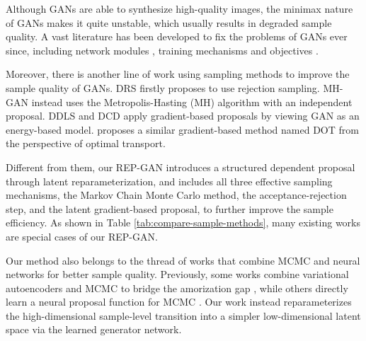 \documentclass[runningheads]{llncs}
\newcommand{\<}{\left\langle}
\renewcommand{\>}{\right\rangle}
\begin{document}
Although GANs are able to synthesize high-quality images, the minimax nature of GANs makes it quite unstable, which usually results in degraded sample quality. 
A vast literature has been developed to fix the problems of GANs ever since, including network modules \cite{miyato2018spectral}, training mechanisms \cite{metz2016unrolled} and  objectives \cite{arjovsky2017wasserstein}.


Moreover, there is another line of work using sampling methods to improve the sample quality of GANs. DRS \cite{azadi2019discriminator} firstly proposes to use rejection sampling. MH-GAN \cite{turner2019metropolis} instead uses the Metropolis-Hasting (MH) algorithm with an independent proposal. DDLS \cite{che2020your} and DCD \cite{song2020discriminator} apply  gradient-based proposals by viewing GAN as an energy-based model. \cite{tanaka2019discriminator} proposes a similar gradient-based method named DOT from the perspective of optimal transport. 

Different from them, our REP-GAN introduces a structured dependent proposal through latent reparameterization, and includes all three effective sampling mechanisms, the Markov Chain Monte Carlo method, the acceptance-rejection step, and the latent gradient-based proposal, to further improve the sample efficiency. As shown in Table \ref{tab:compare-sample-methods}, many existing works are special cases of our REP-GAN. 

Our method also belongs to the thread of works that combine MCMC and neural networks for better sample quality. Previously, some works combine variational autoencoders \cite{kingma2013auto} and MCMC to bridge the amorization gap \cite{salimans2015markov,hoffman2017learning,li2017approximate}, while others directly learn a neural proposal function for MCMC \cite{song2017nice,levy2017generalizing,wang2018meta}. Our work instead reparameterizes the high-dimensional sample-level transition into a simpler low-dimensional latent space via the learned generator network. 
\end{document}
